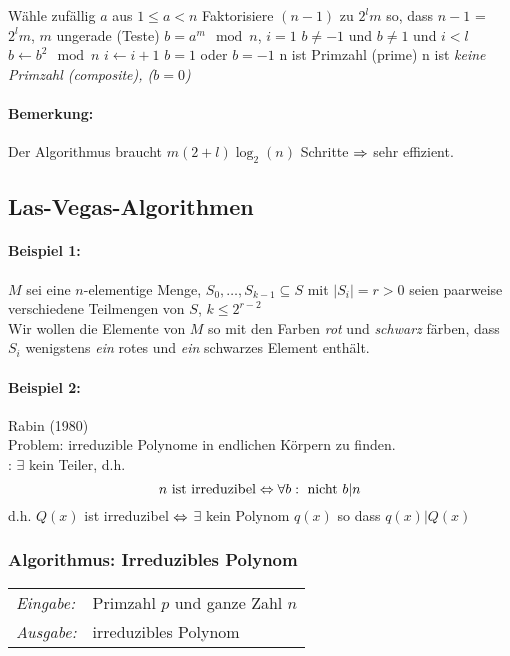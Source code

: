 \documentclass[a4paper]{scrartcl}
\begin{document}
\begin{codebox}
\li Wähle zufällig $a$ aus $1 \leq a < n$
\li Faktorisiere $(n-1)$ zu $2^l m$ so, dass $n-1$ = $2^l m$, $m$ ungerade
\li (Teste) $b = a^m \mod n$, $i = 1$ 
\li \While $b \neq -1$ und $b \neq 1$ und $i < l$
\li     \Do 
            $b \gets b^2 \mod n$
\li         $i \gets i + 1$
        \End
\li \If $b = 1$ oder $b = -1$
\li     \Then
                n ist Primzahl (prime)
\li     \Else
                n ist \em{keine} Primzahl (composite), ($b = 0$)
\end{codebox}

\paragraph{Bemerkung:} Der Algorithmus braucht $m(2+l)\log_2(n)$ Schritte $\Rightarrow$ sehr effizient.

\subsection{Las-Vegas-Algorithmen}

\paragraph{Beispiel 1:} $M$ sei eine $n$-elementige Menge, $S_0, \dots, S_{k-1} \subseteq S$ mit $|S_i|=r>0$ seien paarweise verschiedene Teilmengen von $S$, $k \le 2^{r-2}$\\
Wir wollen die Elemente von $M$ so mit den Farben \emph{rot} und \emph{schwarz} färben, dass $S_i$ wenigstens \emph{ein} rotes und \emph{ein} schwarzes Element enthält.

\paragraph{Beispiel 2:} Rabin (1980)\\
Problem: irreduzible Polynome in endlichen Körpern zu finden.\\
: $\exists$ kein Teiler, d.h. $$n \text{ ist irreduzibel} \Leftrightarrow \forall b: \text{ nicht } b|n$$
d.h. $Q(x)$ ist irreduzibel $\Leftrightarrow$ $\exists$ kein Polynom $q(x)$ so dass $q(x)|Q(x)$

\subsubsection{Algorithmus: Irreduzibles Polynom}
\begin{tabular}{ll}
	\emph{Eingabe:} & Primzahl $p$ und ganze Zahl $n$\\
	\emph{Ausgabe:} & irreduzibles Polynom
\end{tabular}\bigskip
\end{document}
